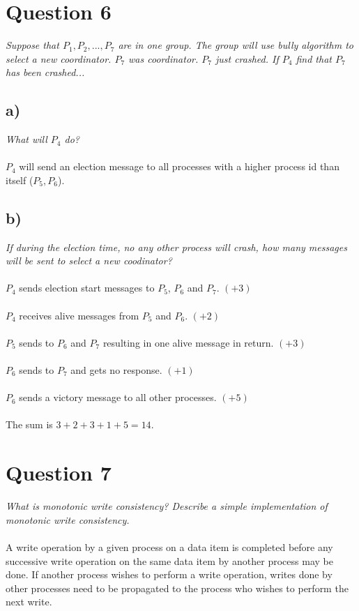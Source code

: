 \documentclass[a4paper, titlepage,12pt]{article}
\begin{document}
	\section*{Question 6}
	\emph{Suppose that $P_1, P_2, ..., P_7$ are in one group. The group will use bully algorithm to select a new coordinator. $P_7$ was coordinator. $P_7$ just crashed. If $P_4$ find that $P_7$ has been crashed...}
	\subsection*{a)}
	\emph{What will $P_4$ do?} 
\\\\
	$P_4$ will send an election message to all processes with a higher process id than itself ($P_5, P_6$).
	\subsection*{b)} \emph{If during the election time, no any other process will crash, how many messages will be sent to select a new coodinator?}
\\\\
	$P_4$ sends election start messages to $P_5$, $P_6$ and $P_7$. $(+3)$
\\\\
	$P_4$ receives alive messages from $P_5$ and $P_6$. $(+2)$
\\\\
	$P_5$ sends to $P_6$ and $P_7$ resulting in one alive message in return. $(+3)$
\\\\
	$P_6$ sends to $P_7$ and gets no response. $(+1)$
\\\\
	$P_6$ sends a victory message to all other processes. $(+5)$
\\\\
	The sum is $3 + 2 + 3 + 1 + 5 = 14$.

	\section*{Question 7}
	\emph{What is monotonic write consistency? Describe a simple implementation of monotonic write consistency.}
\\\\
	A write operation by a given process on a data item is completed before any successive write operation on the same data item by another process may be done. If another process wishes to perform a write operation, writes done by other processes need to be propagated to the process who wishes to perform the next write.
\end{document}
